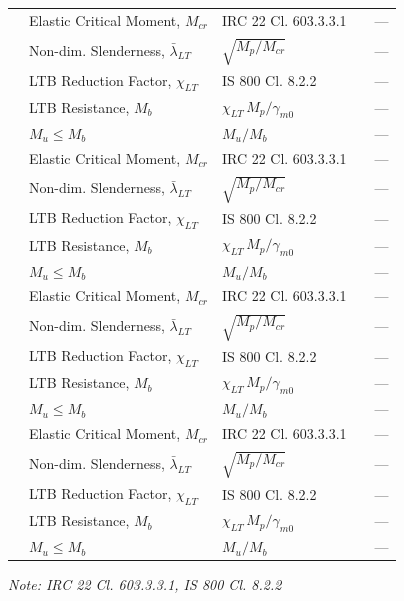 \documentclass[12pt,a4paper]{report}
\numberwithin{table}{chapter}
\numberwithin{figure}{chapter}
\begin{document}
\begin{longtable}{|C{2.5cm}|C{3.5cm}|C{3.5cm}|>{\centering\arraybackslash}p{4.2cm}|C{1.8cm}|}
\hline
\endlastfoot
{} & Elastic Critical Moment, $M_{cr}$ & IRC 22 Cl. 603.3.3.1 &  & --- \\[6pt]
 & Non-dim. Slenderness, $\bar{\lambda}_{LT}$ & $\sqrt{M_p / M_{cr}}$ &  & --- \\[6pt]
 & LTB Reduction Factor, $\chi_{LT}$ & IS 800 Cl. 8.2.2 &  & --- \\[6pt]
 & LTB Resistance, $M_b$ & $\chi_{LT}\,M_p / \gamma_{m0}$ &  & --- \\[6pt]
 & $M_u \leq M_b$ & $M_u / M_b$ &  & --- \\[6pt]
\hline
{} & Elastic Critical Moment, $M_{cr}$ & IRC 22 Cl. 603.3.3.1 &  & --- \\[6pt]
 & Non-dim. Slenderness, $\bar{\lambda}_{LT}$ & $\sqrt{M_p / M_{cr}}$ &  & --- \\[6pt]
 & LTB Reduction Factor, $\chi_{LT}$ & IS 800 Cl. 8.2.2 &  & --- \\[6pt]
 & LTB Resistance, $M_b$ & $\chi_{LT}\,M_p / \gamma_{m0}$ &  & --- \\[6pt]
 & $M_u \leq M_b$ & $M_u / M_b$ &  & --- \\[6pt]
\hline
{} & Elastic Critical Moment, $M_{cr}$ & IRC 22 Cl. 603.3.3.1 &  & --- \\[6pt]
 & Non-dim. Slenderness, $\bar{\lambda}_{LT}$ & $\sqrt{M_p / M_{cr}}$ &  & --- \\[6pt]
 & LTB Reduction Factor, $\chi_{LT}$ & IS 800 Cl. 8.2.2 &  & --- \\[6pt]
 & LTB Resistance, $M_b$ & $\chi_{LT}\,M_p / \gamma_{m0}$ &  & --- \\[6pt]
 & $M_u \leq M_b$ & $M_u / M_b$ &  & --- \\[6pt]
\hline
{} & Elastic Critical Moment, $M_{cr}$ & IRC 22 Cl. 603.3.3.1 &  & --- \\[6pt]
 & Non-dim. Slenderness, $\bar{\lambda}_{LT}$ & $\sqrt{M_p / M_{cr}}$ &  & --- \\[6pt]
 & LTB Reduction Factor, $\chi_{LT}$ & IS 800 Cl. 8.2.2 &  & --- \\[6pt]
 & LTB Resistance, $M_b$ & $\chi_{LT}\,M_p / \gamma_{m0}$ &  & --- \\[6pt]
 & $M_u \leq M_b$ & $M_u / M_b$ &  & --- \\[6pt]
\hline
\end{longtable}
\noindent\textit{Note: IRC 22 Cl. 603.3.3.1, IS 800 Cl. 8.2.2}
\end{document}

